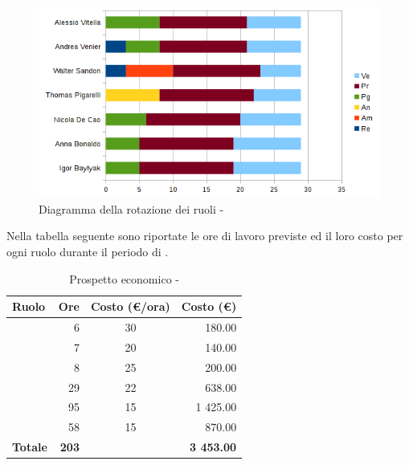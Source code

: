 \documentclass[12pt,a4paper]{article}
\begin{document}
\begin{center}
	\begin{figure}[H]
		\centering		\includegraphics[width=\textwidth]{../img/diagrammaBarreProgettazioneDettaglioCodificaRotazioneRuoli.png}
		\caption{Diagramma della rotazione dei ruoli - \FPDC{}}
	\end{figure}
\end{center}

\newpage
{}
Nella tabella seguente sono riportate le ore di lavoro previste ed il loro costo per ogni ruolo durante il periodo di \FC.

\begin{table}[H]
	\begin{center}
		\begin{tabular}{l r c r}
			\toprule
			\textbf{Ruolo}	& \textbf{Ore} & \textbf{Costo (\euro/ora)}	& \textbf{Costo (\euro)} \\ \midrule
			\midrule
			\RE{} & 6 & 30 & 180.00 \\ \midrule
			\AM{} & 7 & 20 & 140.00 \\ \midrule
			\AN{} & 8 & 25 & 200.00 \\ \midrule
			\PG{} & 29 & 22 & 638.00 \\ \midrule
			\PR{} & 95 & 15 & 1 425.00 \\ \midrule
			\VR{} & 58 & 15 & 870.00 \\ \midrule
			\textbf{Totale} & \textbf{203} &  & \textbf{3 453.00} \\
			\bottomrule
		\end{tabular}
		\caption{Prospetto economico - \FPDC{}}
	\end{center}
\end{table}
\end{document}
